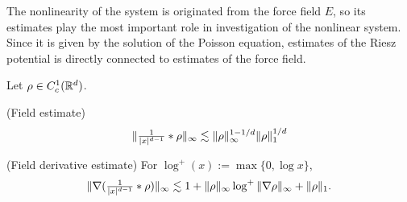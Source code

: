 \documentclass[11pt]{amsart}
\begin{document}
The nonlinearity of the system is originated from the force field $E$, so its estimates play the most important role in investigation of the nonlinear system.
Since it is given by the solution of the Poisson equation, estimates of the Riesz potential is directly connected to estimates of the force field.


\begin{lem}
Let $\rho\in C_c^1(\mathbb{R}^d)$.
\begin{cond}
\item(Field estimate)
\[\|\tfrac1{|x|^{d-1}}*\rho\|_\infty\lesssim\|\rho\|_\infty^{1-1/d}\|\rho\|_1^{1/d}\]
\item(Field derivative estimate)
For $\log^+(x):=\max\{0,\log x\}$,
\[\|\nabla(\tfrac1{|x|^{d-1}}*\rho)\|_\infty\lesssim1+\|\rho\|_\infty\log^+\|\nabla\rho\|_\infty+\|\rho\|_1.\]
\end{cond}
\end{lem}
\iffalse
\begin{rmk}
Note that the constants hidden in symbol $\les$ in these estimate cannot depend on $f_0$ since the theorem is actually not about the Vlasov-Poisson system but the Poisson equation; the constant only depends on the dimension $d=3$.
\end{rmk}
\fi
\end{document}
